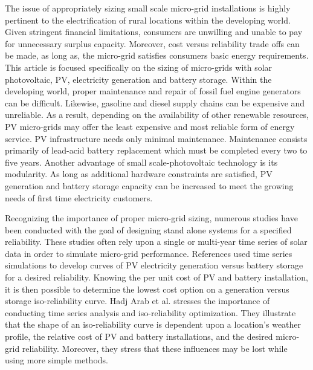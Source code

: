 \documentclass[11p]{article}
\begin{document}
The issue of appropriately sizing small scale micro-grid installations is highly pertinent to the electrification of rural locations within the developing world. 
Given stringent financial limitations, consumers are unwilling and unable to pay for unnecessary surplus capacity. 
Moreover, cost versus reliability trade offs can be made, as long as, the micro-grid satisfies consumers basic energy requirements. \cite{Marawanyika} 
This article is focused specifically on the sizing of micro-grids with solar photovoltaic, PV, electricity generation and battery storage. 
Within the developing world, proper maintenance and repair of fossil fuel engine generators can be difficult. 
Likewise, gasoline and diesel supply chains can be expensive and unreliable.  
As a result, depending on the availability of other renewable resources, PV micro-grids may offer the least expensive and most reliable form of energy service. \cite{Nouni,WB}
PV infrastructure needs only minimal maintenance.
Maintenance consists primarily of lead-acid battery replacement which must be completed every two to five years. 
Another advantage of small scale-photovoltaic technology is its modularity.  
As long as additional hardware constraints are satisfied, PV generation and battery storage capacity can be increased to meet the growing needs of first time electricity customers. \cite{Wamukonya}  

Recognizing the importance of proper micro-grid sizing, numerous studies have been conducted with the goal of designing stand alone systems for a specified reliability. 
These studies often rely upon a single or multi-year time series of solar data in order to simulate micro-grid performance. 
References \cite{Markvart,Arun,Hadj} used time series simulations to develop curves of PV electricity generation versus battery storage for a desired reliability. 
Knowing the per unit cost of PV and battery installation, it is then possible to determine the lowest cost option on a generation versus storage iso-reliability curve. 
Hadj Arab et al. stresses the importance of conducting time series analysis and iso-reliability optimization. 
They illustrate that the shape of an iso-reliability curve is dependent upon a location's weather profile, the relative cost of PV and battery installations, and the desired micro-grid reliability. 
Moreover, they stress that these influences may be lost while using more simple methods. \cite{Hadj}   
\end{document}

